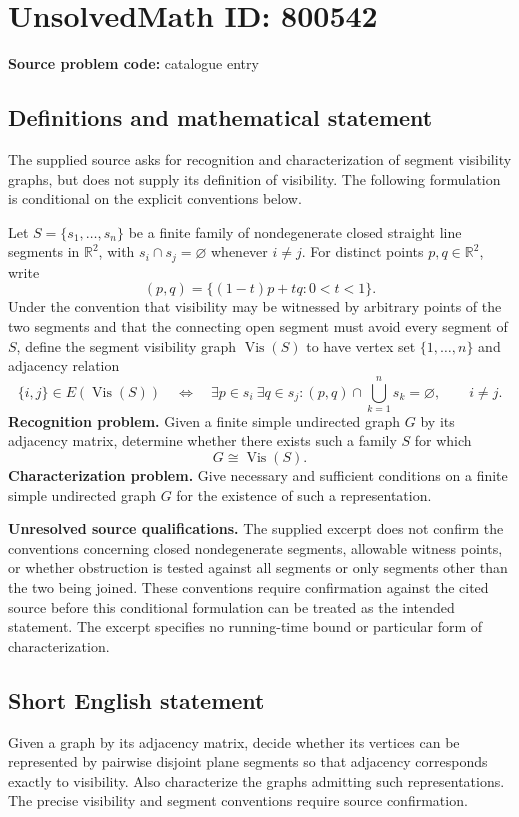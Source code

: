 \documentclass[11pt]{article}
\newcommand{\R}{\mathbb{R}}
\begin{document}
\section*{UnsolvedMath ID: 800542}
\textbf{Source problem code:} catalogue entry
\subsection{Definitions and mathematical statement}
The supplied source asks for recognition and characterization of segment visibility graphs, but does not supply its definition of visibility. The following formulation is conditional on the explicit conventions below.

Let \(S=\{s_1,\ldots,s_n\}\) be a finite family of nondegenerate closed straight line segments in \(\R^2\), with \(s_i\cap s_j=\varnothing\) whenever \(i\ne j\). For distinct points \(p,q\in\R^2\), write
\[
(p,q)=\{(1-t)p+tq:0<t<1\}.
\]
Under the convention that visibility may be witnessed by arbitrary points of the two segments and that the connecting open segment must avoid every segment of \(S\), define the segment visibility graph \(\operatorname{Vis}(S)\) to have vertex set \(\{1,\ldots,n\}\) and adjacency relation
\[
\{i,j\}\in E(\operatorname{Vis}(S))
\quad\Longleftrightarrow\quad
\exists p\in s_i\ \exists q\in s_j:
(p,q)\cap\bigcup_{k=1}^{n}s_k=\varnothing,
\qquad i\ne j.
\]
\textbf{Recognition problem.} Given a finite simple undirected graph \(G\) by its adjacency matrix, determine whether there exists such a family \(S\) for which
\[
G\cong\operatorname{Vis}(S).
\]
\textbf{Characterization problem.} Give necessary and sufficient conditions on a finite simple undirected graph \(G\) for the existence of such a representation.

\textbf{Unresolved source qualifications.} The supplied excerpt does not confirm the conventions concerning closed nondegenerate segments, allowable witness points, or whether obstruction is tested against all segments or only segments other than the two being joined. These conventions require confirmation against the cited source before this conditional formulation can be treated as the intended statement. The excerpt specifies no running-time bound or particular form of characterization.
\subsection{Short English statement}
Given a graph by its adjacency matrix, decide whether its vertices can be represented by pairwise disjoint plane segments so that adjacency corresponds exactly to visibility. Also characterize the graphs admitting such representations. The precise visibility and segment conventions require source confirmation.
\end{document}
